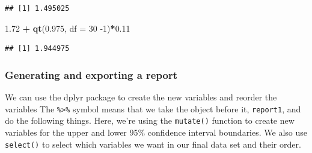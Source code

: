 \documentclass[
]{article}
\newenvironment{Shaded}{\begin{snugshade}}{\end{snugshade}}
\newcommand{\CommentTok}[1]{\textcolor[rgb]{0.56,0.35,0.01}{\textit{#1}}}
\newcommand{\DataTypeTok}[1]{\textcolor[rgb]{0.13,0.29,0.53}{#1}}
\newcommand{\DecValTok}[1]{\textcolor[rgb]{0.00,0.00,0.81}{#1}}
\newcommand{\FloatTok}[1]{\textcolor[rgb]{0.00,0.00,0.81}{#1}}
\newcommand{\KeywordTok}[1]{\textcolor[rgb]{0.13,0.29,0.53}{\textbf{#1}}}
\newcommand{\NormalTok}[1]{#1}
\newcommand{\OperatorTok}[1]{\textcolor[rgb]{0.81,0.36,0.00}{\textbf{#1}}}
\newcommand{\StringTok}[1]{\textcolor[rgb]{0.31,0.60,0.02}{#1}}
\begin{document}
\begin{verbatim}
## [1] 1.495025
\end{verbatim}

\begin{Shaded}
\begin{Highlighting}[]
\FloatTok{1.72} \OperatorTok{+}\StringTok{ }\KeywordTok{qt}\NormalTok{(}\FloatTok{0.975}\NormalTok{, }\DataTypeTok{df =} \DecValTok{30} \DecValTok{-1}\NormalTok{)}\OperatorTok{*}\FloatTok{0.11}
\end{Highlighting}
\end{Shaded}

\begin{verbatim}
## [1] 1.944975
\end{verbatim}

\hypertarget{generating-and-exporting-a-report}{%
\subsubsection{Generating and exporting a report}\label{generating-and-exporting-a-report}}

We can use the dplyr package to create the new variables and reorder the variables The \texttt{\%\textgreater{}\%} symbol means that we take the object before it, \texttt{report1}, and do the following things. Here, we're using the \texttt{mutate()} function to create new variables for the upper and lower 95\% confidence interval boundaries. We also use \texttt{select()} to select which variables we want in our final data set and their order.

\begin{Shaded}
\end{Shaded}
\end{document}
